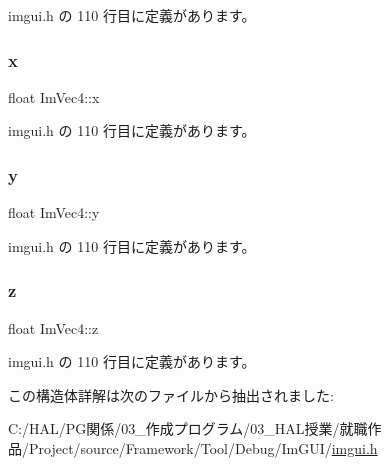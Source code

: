  imgui.\+h の 110 行目に定義があります。

\mbox{\label{struct_im_vec4_a2090f651f5e5b78fedae8dab87343db6}} 
\subsubsection{\texorpdfstring{x}{x}}
{\footnotesize\ttfamily float Im\+Vec4\+::x}



 imgui.\+h の 110 行目に定義があります。

\mbox{\label{struct_im_vec4_a6b4d00ae261be4fe54353c759c561fe7}} 
\subsubsection{\texorpdfstring{y}{y}}
{\footnotesize\ttfamily float Im\+Vec4\+::y}



 imgui.\+h の 110 行目に定義があります。

\mbox{\label{struct_im_vec4_aba6a75356917a28c967954bb29133a1a}} 
\subsubsection{\texorpdfstring{z}{z}}
{\footnotesize\ttfamily float Im\+Vec4\+::z}



 imgui.\+h の 110 行目に定義があります。



この構造体詳解は次のファイルから抽出されました\+:\begin{DoxyCompactItemize}
\item 
C\+:/\+H\+A\+L/\+P\+G関係/03\+\_\+作成プログラム/03\+\_\+\+H\+A\+L授業/就職作品/\+Project/source/\+Framework/\+Tool/\+Debug/\+Im\+G\+U\+I/\mbox{\hyperlink{imgui_8h}{imgui.\+h}}\end{DoxyCompactItemize}
